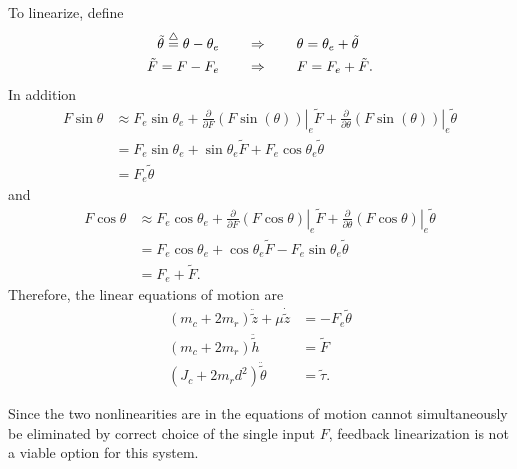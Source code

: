 To linearize, define
\begin{align*}
\tilde{\theta} \stackrel{\triangle}{=} \theta - \theta_e &\qquad \Rightarrow \qquad \theta = \theta_e + \tilde{\theta} \\
\tilde{F} = F - F_e &\qquad \Rightarrow \qquad F = F_e + \tilde{F}.
\end{align*}
In addition
\begin{align*}
F \sin\theta &\approx F_e \sin\theta_e + \left. \frac{\partial}{\partial F} \left(F \sin(\theta)\right)\right|_e \tilde{F} + \left. \frac{\partial}{\partial \theta} \left(F \sin(\theta)\right)\right|_e \tilde{\theta} \\
	&= F_e \sin\theta_e + \sin\theta_e \tilde{F} + F_e \cos\theta_e \tilde{\theta} \\
	&= F_e \tilde{\theta}
\end{align*}
and
\begin{align*}
F \cos\theta &\approx F_e \cos\theta_e + \left. \frac{\partial}{\partial F} \left(F \cos\theta\right)\right|_e \tilde{F} + \left. \frac{\partial}{\partial \theta} \left(F \cos\theta\right)\right|_e \tilde{\theta}\\
	&= F_e \cos\theta_e + \cos\theta_e \tilde{F} - F_e \sin\theta_e \tilde{\theta} \\
	&= F_e + \tilde{F}.
\end{align*}
Therefore, the linear equations of motion are
\begin{align*}
\left( m_c + 2 m_r \right) \ddot{\tilde{z}} + \mu \dot{\tilde{z}} &=  -F_e \tilde{\theta}   \\
\left( m_c + 2 m_r \right) \ddot{\tilde{h}} &= \tilde{F}\\
\left( J_c + 2 m_r d^2 \right) \ddot{\tilde{\theta}} &= \tilde{\tau}.
\end{align*}

Since the two nonlinearities are in the equations of motion cannot simultaneously be eliminated by correct choice of the single input $F$, feedback linearization is not a viable option for this system.
